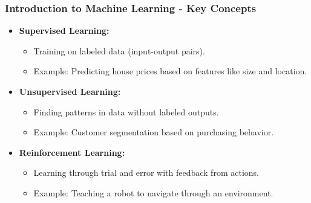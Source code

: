 \documentclass{beamer}
\begin{document}
\begin{frame}[fragile]
    \frametitle{Introduction to Machine Learning - Key Concepts}
    \begin{itemize}
        \item \textbf{Supervised Learning:} 
            \begin{itemize}
                \item Training on labeled data (input-output pairs). 
                \item Example: Predicting house prices based on features like size and location.
            \end{itemize}
        \item \textbf{Unsupervised Learning:} 
            \begin{itemize}
                \item Finding patterns in data without labeled outputs. 
                \item Example: Customer segmentation based on purchasing behavior.
            \end{itemize}
        \item \textbf{Reinforcement Learning:} 
            \begin{itemize}
                \item Learning through trial and error with feedback from actions. 
                \item Example: Teaching a robot to navigate through an environment.
            \end{itemize}
    \end{itemize}
\end{frame}
\end{document}
